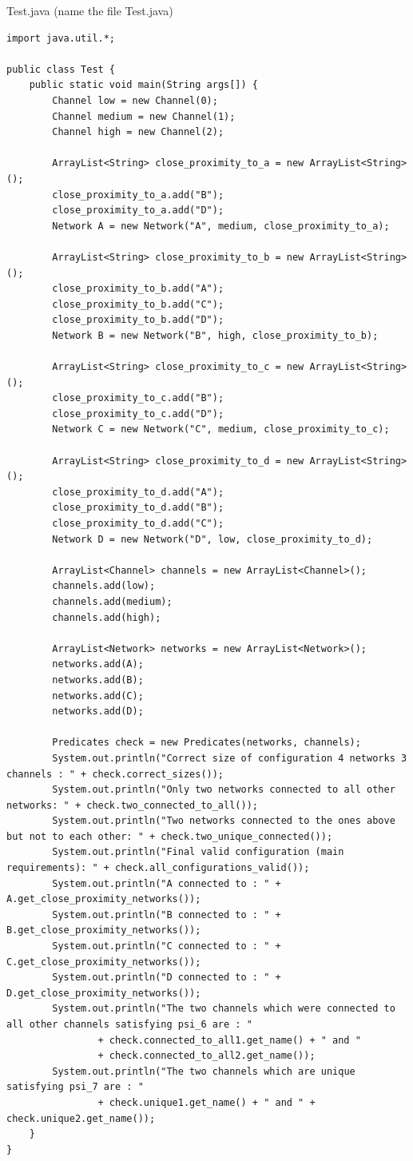 \documentclass{article}
\begin{document}
Test.java (name the file Test.java)
\begin{lstlisting}
import java.util.*;

public class Test {
    public static void main(String args[]) {
        Channel low = new Channel(0);
        Channel medium = new Channel(1);
        Channel high = new Channel(2);

        ArrayList<String> close_proximity_to_a = new ArrayList<String>();
        close_proximity_to_a.add("B");
        close_proximity_to_a.add("D");
        Network A = new Network("A", medium, close_proximity_to_a);

        ArrayList<String> close_proximity_to_b = new ArrayList<String>();
        close_proximity_to_b.add("A");
        close_proximity_to_b.add("C");
        close_proximity_to_b.add("D");
        Network B = new Network("B", high, close_proximity_to_b);

        ArrayList<String> close_proximity_to_c = new ArrayList<String>();
        close_proximity_to_c.add("B");
        close_proximity_to_c.add("D");
        Network C = new Network("C", medium, close_proximity_to_c);

        ArrayList<String> close_proximity_to_d = new ArrayList<String>();
        close_proximity_to_d.add("A");
        close_proximity_to_d.add("B");
        close_proximity_to_d.add("C");
        Network D = new Network("D", low, close_proximity_to_d);

        ArrayList<Channel> channels = new ArrayList<Channel>();
        channels.add(low);
        channels.add(medium);
        channels.add(high);

        ArrayList<Network> networks = new ArrayList<Network>();
        networks.add(A);
        networks.add(B);
        networks.add(C);
        networks.add(D);

        Predicates check = new Predicates(networks, channels);
        System.out.println("Correct size of configuration 4 networks 3 channels : " + check.correct_sizes());
        System.out.println("Only two networks connected to all other networks: " + check.two_connected_to_all());
        System.out.println("Two networks connected to the ones above but not to each other: " + check.two_unique_connected());
        System.out.println("Final valid configuration (main requirements): " + check.all_configurations_valid());
        System.out.println("A connected to : " + A.get_close_proximity_networks());
        System.out.println("B connected to : " + B.get_close_proximity_networks());
        System.out.println("C connected to : " + C.get_close_proximity_networks());
        System.out.println("D connected to : " + D.get_close_proximity_networks());
        System.out.println("The two channels which were connected to all other channels satisfying psi_6 are : "
                + check.connected_to_all1.get_name() + " and "
                + check.connected_to_all2.get_name());
        System.out.println("The two channels which are unique satisfying psi_7 are : "
                + check.unique1.get_name() + " and " + check.unique2.get_name());
    }
}

\end{lstlisting}
\end{document}
